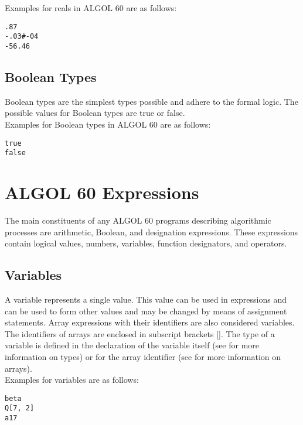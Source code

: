 \documentclass{article}
\begin{document}
Examples for reals in ALGOL 60 are as follows:\\

\begin{lstlisting}[language={[60]algol}]
.87
-.03#-04
-56.46
\end{lstlisting}

\subsection{Boolean Types}
Boolean types are the simplest types possible and adhere to the formal logic. The possible values for Boolean types are true or false.\\

Examples for Boolean types in ALGOL 60 are as follows:\\

\begin{lstlisting}[language={[60]algol}]
true
false
\end{lstlisting}

\newpage

\section{ALGOL 60 Expressions}
The main constituents of any ALGOL 60 programs describing algorithmic processes are arithmetic, Boolean, and designation expressions. These expressions contain logical values, numbers, variables, function designators, and operators.

\subsection{Variables}
A variable represents a single value. This value can be used in expressions and can be used to form other values and may be changed by means of assignment statements. Array expressions with their identifiers are also considered variables. The identifiers of arrays are enclosed in subscript brackets []. The type of a variable is defined in the declaration of the variable itself (see  for more information on types) or for the array identifier (see  for more information on arrays).\\

Examples for variables are as follows:\\

\begin{lstlisting}[language={[60]algol}]
beta
Q[7, 2]
a17
\end{lstlisting}
\end{document}
